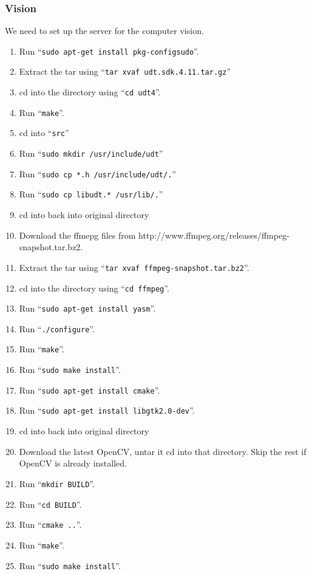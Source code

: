 \documentclass{article}
\begin{document}
\subsubsection{Vision}
We need to set up the server for the computer vision.

\begin{enumerate}
    \item Run ``{\tt sudo apt-get install pkg-configsudo}''.
    \item Extract the tar using ``{\tt tar xvaf udt.sdk.4.11.tar.gz}''
    \item cd into the directory using ``{\tt cd udt4}''.
    \item Run ``{\tt make}''.
    \item cd into ``{\tt src}''
    \item Run ``{\tt sudo mkdir /usr/include/udt}''
    \item Run ``{\tt sudo cp *.h /usr/include/udt/.}''
    \item Run ``{\tt sudo cp libudt.* /usr/lib/.}''
    \item cd into back into original directory
    \item Download the ffmepg files from http://www.ffmpeg.org/releases/ffmpeg-snapshot.tar.bz2.
    \item Extract the tar using ``{\tt tar xvaf ffmpeg-snapshot.tar.bz2}''.
    \item cd into the directory using ``{\tt cd ffmpeg}''.
    \item Run ``{\tt sudo apt-get install yasm}''.
    \item Run ``{\tt ./configure}''.
    \item Run ``{\tt make}''.
    \item Run ``{\tt sudo make install}''.
    \item Run ``{\tt sudo apt-get install cmake}''.
    \item Run ``{\tt sudo apt-get install libgtk2.0-dev}''.
    \item cd into back into original directory
    \item Download the latest OpenCV, untar it cd into that directory. Skip the rest if OpenCV is already installed.
    \item Run ``{\tt mkdir BUILD}''.
    \item Run ``{\tt cd BUILD}''.
    \item Run ``{\tt cmake ..}''.
    \item Run ``{\tt make}''.
    \item Run ``{\tt sudo make install}''.
\end{enumerate}
\end{document}
